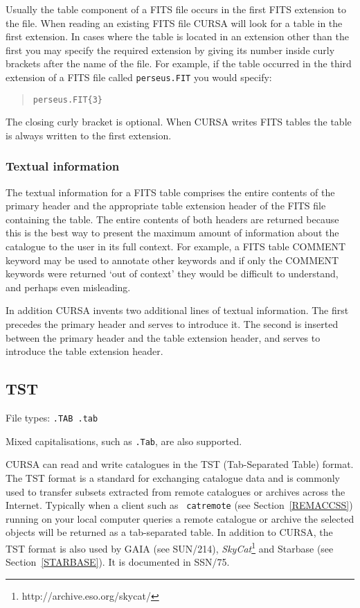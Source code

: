 \documentclass[twoside,11pt]{article}
\newcommand{\htmladdnormallinkfoot}[2]{#1\footnote{#2}}
\newcommand{\xref}[3]{#1}
\renewcommand{\_}{\texttt{\symbol{95}}}
\begin{document}
Usually the table component of a FITS file occurs in the first FITS
extension to the file. When reading an existing FITS file CURSA will look
for a table in the first extension. In cases where the table is located
in an extension other than the first you may specify the required 
extension by giving its number inside curly brackets after the name
of the file. For example, if the table occurred in the third extension
of a FITS file called {\tt perseus.FIT} you would specify:

\begin{verse}
{\tt perseus.FIT\{3\} }
\end{verse}

The closing curly bracket is optional. When CURSA writes FITS tables
the table is always written to the first extension.

\subsubsection{Textual information}

The textual information for a FITS table comprises the entire contents
of the primary header and the appropriate table extension header of the
FITS file containing the table. The entire contents of both headers are
returned because this is the best way to present the maximum amount of
information about the catalogue to the user in its full context. For
example, a FITS table COMMENT keyword may be used to annotate other
keywords and if only the COMMENT keywords were returned `out of context'
they would be difficult to understand, and perhaps even misleading.

In addition CURSA invents two additional lines of textual information.
The first precedes the primary header and serves to introduce it. The
second is inserted between the primary header and the table extension
header, and serves to introduce the table extension header.

\subsection{\label{TST}TST}

File types: {\tt .TAB  .tab}

Mixed capitalisations, such as {\tt .Tab}, are also supported.

CURSA can read and write catalogues in the TST (Tab-Separated Table)
format.  The TST format is a standard for exchanging catalogue data
and is commonly used to transfer subsets extracted from remote catalogues
or archives across the Internet.  Typically when a client such as {\tt
catremote} (see Section~\ref{REMACCSS}) running on your local computer
queries a remote catalogue or archive the selected objects will be returned
as a tab-separated table.  In addition to CURSA, the TST format is
also used by GAIA (see \xref{SUN/214}{sun214}{}\cite{SUN214}),
\htmladdnormallinkfoot{{\it SkyCat}\/}{http://archive.eso.org/skycat/}
and Starbase (see Section~\ref{STARBASE}).  It is documented in
\xref{SSN/75}{ssn75}{}\cite{SSN75}.
\end{document}
